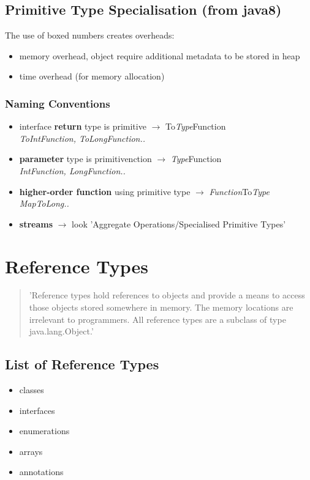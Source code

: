 \documentclass{report}
\begin{document}
\section{Primitive Type Specialisation (from java8)}
The use of boxed numbers creates overheads:
\begin{itemize}
	\item memory overhead, object require additional metadata to be stored in heap
	\item time overhead (for memory allocation)
\end{itemize}

\subsection*{Naming Conventions}
\begin{itemize}
	\item interface \textbf{return} type is primitive $\rightarrow$ To\textit{Type}Function\\
	\textit{ToIntFunction, ToLongFunction..}
	\item \textbf{parameter} type is primitivenction $\rightarrow$ \textit{Type}Function\\
	\textit{IntFunction, LongFunction..}
	\item \textbf{higher-order function} using primitive type $\rightarrow$ \textit{Function}To\textit{Type}\\
	\textit{MapToLong..}
	\item \textbf{streams} $\rightarrow$ look 'Aggregate Operations/Specialised Primitive Types'
\end{itemize}



\chapter{Reference Types}
\begin{quotation}
	'Reference types hold references to objects and provide a means to access those objects stored somewhere in memory. The memory locations are irrelevant to programmers. All reference types are a subclass of type java.lang.Object.'
\end{quotation}


\section{List of Reference Types}
\begin{itemize}
	\item classes
	\item interfaces
	\item enumerations
	\item arrays
	\item annotations
\end{itemize}
\end{document}
